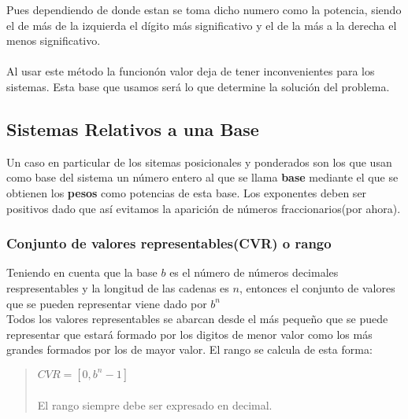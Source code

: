 \documentclass{article}
\begin{document}
Pues dependiendo de donde estan se toma dicho numero como la potencia,
siendo el de más de la izquierda el dígito más significativo y el de la más a la derecha
el menos significativo.\\\\

Al usar este método la funcionón valor deja de tener inconvenientes para los sistemas. Esta base que usamos
será lo que determine la solución del problema.
\subsection{Sistemas Relativos a una Base}
Un caso en particular de los sitemas posicionales y ponderados son los que usan como base del sistema
un número entero al que se llama \textbf{base} mediante el que se obtienen los \textbf{pesos} como
potencias de esta base. Los exponentes deben ser positivos dado que así evitamos la aparición de números
fraccionarios(por ahora).
\newpage
\subsubsection{Conjunto de valores representables(CVR) o rango}
Teniendo en cuenta que la base  $b$ es el número de números decimales respresentables y la longitud de
las cadenas es $n$, entonces el conjunto de valores que se pueden representar viene dado por $b^n$\\
Todos los valores representables se abarcan desde el más pequeño que se puede representar que estará 
formado por los digitos de menor valor como los más grandes formados por los de mayor valor. El rango
se calcula de esta forma:
\begin{quote}
    $CVR = [0, b^n - 1]$\\\\
    El rango siempre debe ser expresado en decimal.
\end{quote}
\end{document}
